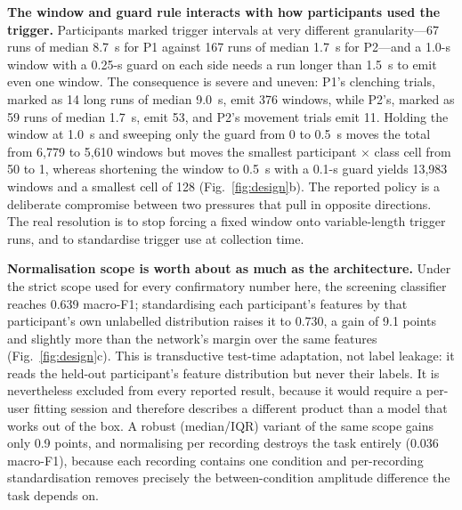 \documentclass[pdflatex,sn-nature,iicol]{sn-jnl}
\begin{document}
\textbf{The window and guard rule interacts with how participants used the trigger.} Participants marked trigger intervals at very different granularity---67 runs of median 8.7~s for P1 against 167 runs of median 1.7~s for P2---and a 1.0-s window with a 0.25-s guard on each side needs a run longer than 1.5~s to emit even one window. The consequence is severe and uneven: P1's clenching trials, marked as 14 long runs of median 9.0~s, emit 376 windows, while P2's, marked as 59 runs of median 1.7~s, emit 53, and P2's movement trials emit 11. Holding the window at 1.0~s and sweeping only the guard from 0 to 0.5~s moves the total from 6,779 to 5,610 windows but moves the smallest participant $\times$ class cell from 50 to 1, whereas shortening the window to 0.5~s with a 0.1-s guard yields 13,983 windows and a smallest cell of 128 (Fig.~\ref{fig:design}b). The reported policy is a deliberate compromise between two pressures that pull in opposite directions. The real resolution is to stop forcing a fixed window onto variable-length trigger runs, and to standardise trigger use at collection time.

\textbf{Normalisation scope is worth about as much as the architecture.} Under the strict scope used for every confirmatory number here, the screening classifier reaches 0.639 macro-F1; standardising each participant's features by that participant's own unlabelled distribution raises it to 0.730, a gain of 9.1 points and slightly more than the network's margin over the same features (Fig.~\ref{fig:design}c). This is transductive test-time adaptation, not label leakage: it reads the held-out participant's feature distribution but never their labels. It is nevertheless excluded from every reported result, because it would require a per-user fitting session and therefore describes a different product than a model that works out of the box. A robust (median/IQR) variant of the same scope gains only 0.9 points, and normalising per recording destroys the task entirely (0.036 macro-F1), because each recording contains one condition and per-recording standardisation removes precisely the between-condition amplitude difference the task depends on.
\end{document}
